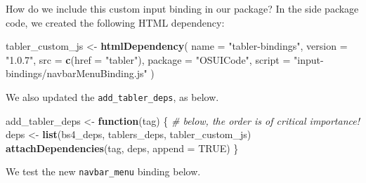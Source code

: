 \documentclass[
]{book}
\newenvironment{Shaded}{\begin{snugshade}}{\end{snugshade}}
\newcommand{\CommentTok}[1]{\textcolor[rgb]{0.56,0.35,0.01}{\textit{#1}}}
\newcommand{\ControlFlowTok}[1]{\textcolor[rgb]{0.13,0.29,0.53}{\textbf{#1}}}
\newcommand{\DataTypeTok}[1]{\textcolor[rgb]{0.13,0.29,0.53}{#1}}
\newcommand{\KeywordTok}[1]{\textcolor[rgb]{0.13,0.29,0.53}{\textbf{#1}}}
\newcommand{\NormalTok}[1]{#1}
\newcommand{\OtherTok}[1]{\textcolor[rgb]{0.56,0.35,0.01}{#1}}
\newcommand{\StringTok}[1]{\textcolor[rgb]{0.31,0.60,0.02}{#1}}
\begin{document}
How do we include this custom input binding in our package? In the side package code, we created the following HTML dependency:

\begin{Shaded}
\begin{Highlighting}[]
\NormalTok{tabler_custom_js <-}\StringTok{ }\KeywordTok{htmlDependency}\NormalTok{(}
  \DataTypeTok{name =} \StringTok{"tabler-bindings"}\NormalTok{,}
  \DataTypeTok{version =} \StringTok{"1.0.7"}\NormalTok{,}
  \DataTypeTok{src =} \KeywordTok{c}\NormalTok{(}\DataTypeTok{href =} \StringTok{"tabler"}\NormalTok{),}
  \DataTypeTok{package =} \StringTok{"OSUICode"}\NormalTok{,}
  \DataTypeTok{script =} \StringTok{"input-bindings/navbarMenuBinding.js"}
\NormalTok{)}
\end{Highlighting}
\end{Shaded}

We also updated the \texttt{add\_tabler\_deps}, as below.

\begin{Shaded}
\begin{Highlighting}[]
\NormalTok{add_tabler_deps <-}\StringTok{ }\ControlFlowTok{function}\NormalTok{(tag) \{}
  \CommentTok{# below, the order is of critical importance!}
\NormalTok{  deps <-}\StringTok{ }\KeywordTok{list}\NormalTok{(bs4_deps, tablers_deps, tabler_custom_js)}
  \KeywordTok{attachDependencies}\NormalTok{(tag, deps, }\DataTypeTok{append =} \OtherTok{TRUE}\NormalTok{)}
\NormalTok{\}}
\end{Highlighting}
\end{Shaded}

We test the new \texttt{navbar\_menu} binding below.
\end{document}
